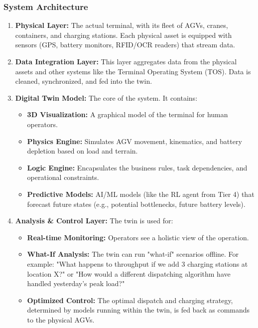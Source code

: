 \documentclass{article}
\begin{document}
\subsubsection*{System Architecture}
\begin{enumerate}
    \item \textbf{Physical Layer:} The actual terminal, with its fleet of AGVs, cranes, containers, and charging stations. Each physical asset is equipped with sensors (GPS, battery monitors, RFID/OCR readers) that stream data.
    \item \textbf{Data Integration Layer:} This layer aggregates data from the physical assets and other systems like the Terminal Operating System (TOS). Data is cleaned, synchronized, and fed into the twin.
    \item \textbf{Digital Twin Model:} The core of the system. It contains:
        \begin{itemize}
            \item \textbf{3D Visualization:} A graphical model of the terminal for human operators.
            \item \textbf{Physics Engine:} Simulates AGV movement, kinematics, and battery depletion based on load and terrain.
            \item \textbf{Logic Engine:} Encapsulates the business rules, task dependencies, and operational constraints.
            \item \textbf{Predictive Models:} AI/ML models (like the RL agent from Tier 4) that forecast future states (e.g., potential bottlenecks, future battery levels).
        \end{itemize}
    \item \textbf{Analysis \& Control Layer:} The twin is used for:
        \begin{itemize}
            \item \textbf{Real-time Monitoring:} Operators see a holistic view of the operation.
            \item \textbf{What-If Analysis:} The twin can run "what-if" scenarios offline. For example: "What happens to throughput if we add 3 charging stations at location X?" or "How would a different dispatching algorithm have handled yesterday's peak load?"
            \item \textbf{Optimized Control:} The optimal dispatch and charging strategy, determined by models running within the twin, is fed back as commands to the physical AGVs.
        \end{itemize}
\end{enumerate}
\end{document}
